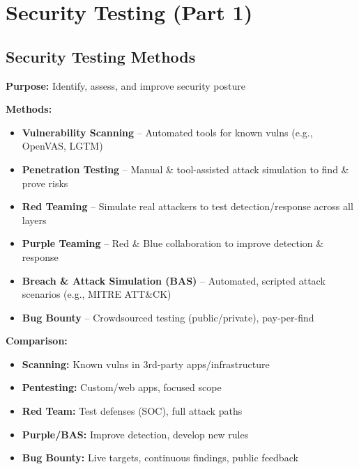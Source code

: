 \section{Security Testing (Part 1)}

\subsection{Security Testing Methods}
{
\textbf{Purpose:} Identify, assess, and improve security posture

\textbf{Methods:}
\begin{itemize}[noitemsep]
  \item \textbf{Vulnerability Scanning} – Automated tools for known vulns (e.g., OpenVAS, LGTM)
  \item \textbf{Penetration Testing} – Manual \& tool-assisted attack simulation to find \& prove risks
  \item \textbf{Red Teaming} – Simulate real attackers to test detection/response across all layers
  \item \textbf{Purple Teaming} – Red \& Blue collaboration to improve detection \& response
  \item \textbf{Breach \& Attack Simulation (BAS)} – Automated, scripted attack scenarios (e.g., MITRE ATT\&CK)
  \item \textbf{Bug Bounty} – Crowdsourced testing (public/private), pay-per-find
\end{itemize}

\textbf{Comparison:}  
\begin{itemize}[noitemsep]
  \item \textbf{Scanning:} Known vulns in 3rd-party apps/infrastructure
  \item \textbf{Pentesting:} Custom/web apps, focused scope
  \item \textbf{Red Team:} Test defenses (SOC), full attack paths
  \item \textbf{Purple/BAS:} Improve detection, develop new rules
  \item \textbf{Bug Bounty:} Live targets, continuous findings, public feedback
\end{itemize}
}

